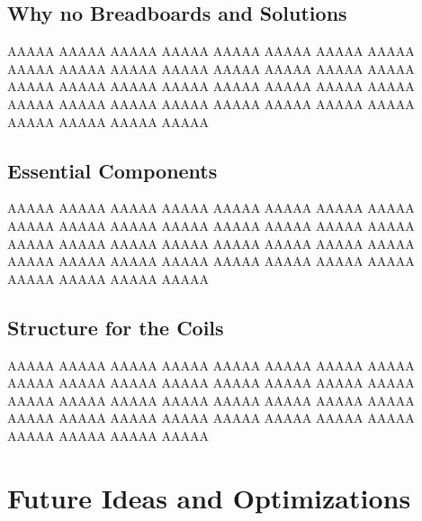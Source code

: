 \section{Why no Breadboards and Solutions}

AAAAA AAAAA AAAAA AAAAA AAAAA AAAAA AAAAA AAAAA AAAAA AAAAA AAAAA AAAAA AAAAA AAAAA AAAAA AAAAA AAAAA AAAAA AAAAA AAAAA AAAAA AAAAA AAAAA AAAAA AAAAA AAAAA AAAAA AAAAA AAAAA AAAAA AAAAA AAAAA AAAAA AAAAA AAAAA AAAAA 

\section{Essential Components}

AAAAA AAAAA AAAAA AAAAA AAAAA AAAAA AAAAA AAAAA AAAAA AAAAA AAAAA AAAAA AAAAA AAAAA AAAAA AAAAA AAAAA AAAAA AAAAA AAAAA AAAAA AAAAA AAAAA AAAAA AAAAA AAAAA AAAAA AAAAA AAAAA AAAAA AAAAA AAAAA AAAAA AAAAA AAAAA AAAAA 

\section{Structure for the Coils}

AAAAA AAAAA AAAAA AAAAA AAAAA AAAAA AAAAA AAAAA AAAAA AAAAA AAAAA AAAAA AAAAA AAAAA AAAAA AAAAA AAAAA AAAAA AAAAA AAAAA AAAAA AAAAA AAAAA AAAAA AAAAA AAAAA AAAAA AAAAA AAAAA AAAAA AAAAA AAAAA AAAAA AAAAA AAAAA AAAAA 

\chapter{Future Ideas and Optimizations}

